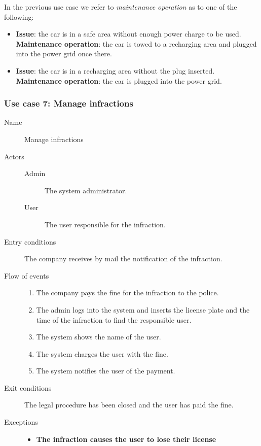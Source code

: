		In the previous use case we refer to \textit{maintenance operation} as to one of the following:
		\begin{itemize}
			\item \textbf{Issue}: the car is in a safe area without enough power charge to be used. \textbf{Maintenance operation}: the car is towed to a recharging area and plugged into the power grid once there.
			\item \textbf{Issue}: the car is in a recharging area without the plug inserted. \textbf{Maintenance operation}: the car is plugged into the power grid.
		\end{itemize}
	
	\subsubsection{Use case 7: Manage infractions}
		\begin{description}
			\item[Name] Manage infractions
			\item[Actors] \hfill
				\begin{description}
					\item[Admin] The system administrator.
					\item[User] The user responsible for the infraction.
				\end{description}
			\item[Entry conditions] The company receives by mail the notification of the infraction.
			\item[Flow of events] \hfill
				\begin{enumerate}
					\item The company pays the fine for the infraction to the police.
					\item The admin logs into the system and inserts the license plate and the time of the infraction to find the responsible user.
					\item The system shows the name of the user.
					\item The system charges the user with the fine.
					\item The system notifies the user of the payment.
				\end{enumerate}
			\item[Exit conditions] The legal procedure has been closed and the user has paid the fine.
			\item[Exceptions] \hfill
				\begin{itemize} %
					\item \textbf{The infraction causes the user to lose their license} %
				\end{itemize}
		\end{description}

